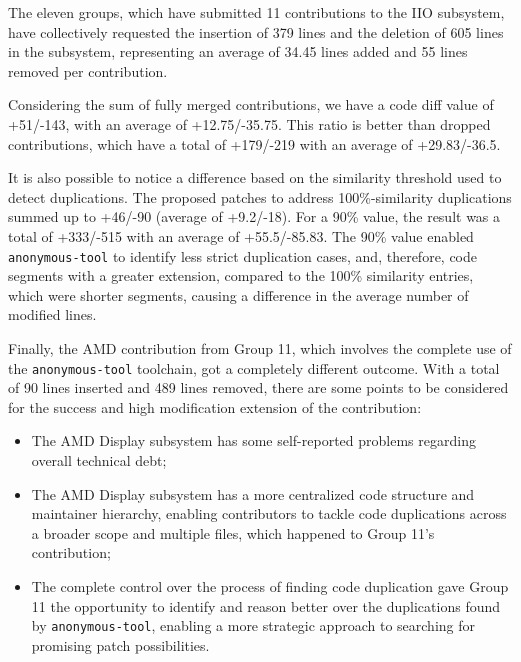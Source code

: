 \documentclass[10pt,conference]{IEEEtran}
\begin{document}

The eleven groups, which have submitted 11 contributions to the IIO subsystem, have collectively requested the insertion of 379 lines and the deletion of 605 lines in the subsystem, representing an average of 34.45 lines added and 55 lines removed per contribution.

Considering the sum of fully merged contributions, we have a code diff value of +51/-143, with an average of +12.75/-35.75. This ratio is better than dropped contributions, which have a total of +179/-219 with an average of +29.83/-36.5.

It is also possible to notice a difference based on the similarity threshold used to detect duplications. The proposed patches to address 100\%-similarity duplications summed up to +46/-90 (average of +9.2/-18). For a 90\% value, the result was a total of +333/-515 with an average of +55.5/-85.83. The 90\% value enabled \texttt{anonymous-tool} to identify less strict duplication cases, and, therefore, code segments with a greater extension, compared to the 100\% similarity entries, which were shorter segments, causing a difference in the average number of modified lines.

Finally, the AMD contribution from Group 11, which involves the complete use of the \texttt{anonymous-tool} toolchain, got a completely different outcome. With a total of 90 lines inserted and 489 lines removed, there are some points to be considered for the success and high modification extension of the contribution:

\begin{itemize}
    \item The AMD Display subsystem has some self-reported problems regarding overall technical debt;
    \item The AMD Display subsystem has a more centralized code structure and maintainer hierarchy, enabling contributors to tackle code duplications across a broader scope and multiple files, which happened to Group 11's contribution;
    \item The complete control over the process of finding code duplication gave Group 11 the opportunity to identify and reason better over the duplications found by \texttt{anonymous-tool}, enabling a more strategic approach to searching for promising patch possibilities. 
\end{itemize}
\end{document}
